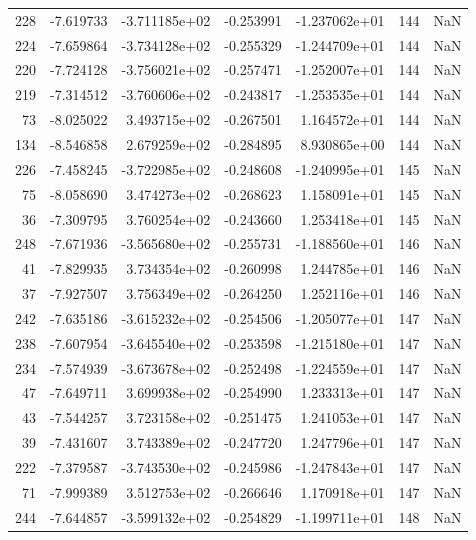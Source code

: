 \begin{tabular}{rrrrrrr}
 228 &  -7.619733 & -3.711185e+02 & -0.253991 & -1.237062e+01 &         144 & NaN \\
 224 &  -7.659864 & -3.734128e+02 & -0.255329 & -1.244709e+01 &         144 & NaN \\
 220 &  -7.724128 & -3.756021e+02 & -0.257471 & -1.252007e+01 &         144 & NaN \\
 219 &  -7.314512 & -3.760606e+02 & -0.243817 & -1.253535e+01 &         144 & NaN \\
  73 &  -8.025022 &  3.493715e+02 & -0.267501 &  1.164572e+01 &         144 & NaN \\
 134 &  -8.546858 &  2.679259e+02 & -0.284895 &  8.930865e+00 &         144 & NaN \\
 226 &  -7.458245 & -3.722985e+02 & -0.248608 & -1.240995e+01 &         145 & NaN \\
  75 &  -8.058690 &  3.474273e+02 & -0.268623 &  1.158091e+01 &         145 & NaN \\
  36 &  -7.309795 &  3.760254e+02 & -0.243660 &  1.253418e+01 &         145 & NaN \\
 248 &  -7.671936 & -3.565680e+02 & -0.255731 & -1.188560e+01 &         146 & NaN \\
  41 &  -7.829935 &  3.734354e+02 & -0.260998 &  1.244785e+01 &         146 & NaN \\
  37 &  -7.927507 &  3.756349e+02 & -0.264250 &  1.252116e+01 &         146 & NaN \\
 242 &  -7.635186 & -3.615232e+02 & -0.254506 & -1.205077e+01 &         147 & NaN \\
 238 &  -7.607954 & -3.645540e+02 & -0.253598 & -1.215180e+01 &         147 & NaN \\
 234 &  -7.574939 & -3.673678e+02 & -0.252498 & -1.224559e+01 &         147 & NaN \\
  47 &  -7.649711 &  3.699938e+02 & -0.254990 &  1.233313e+01 &         147 & NaN \\
  43 &  -7.544257 &  3.723158e+02 & -0.251475 &  1.241053e+01 &         147 & NaN \\
  39 &  -7.431607 &  3.743389e+02 & -0.247720 &  1.247796e+01 &         147 & NaN \\
 222 &  -7.379587 & -3.743530e+02 & -0.245986 & -1.247843e+01 &         147 & NaN \\
  71 &  -7.999389 &  3.512753e+02 & -0.266646 &  1.170918e+01 &         147 & NaN \\
 244 &  -7.644857 & -3.599132e+02 & -0.254829 & -1.199711e+01 &         148 & NaN \\

\end{tabular}
